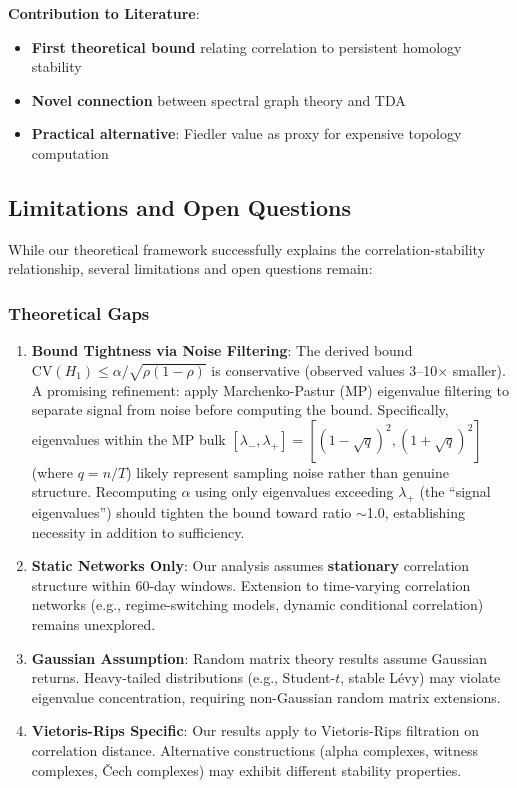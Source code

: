 \textbf{Contribution to Literature}:

\begin{itemize}
\item \textbf{First theoretical bound} relating correlation to persistent homology stability
\item \textbf{Novel connection} between spectral graph theory and TDA
\item \textbf{Practical alternative}: Fiedler value as proxy for expensive topology computation
\end{itemize}

\subsection{Limitations and Open Questions}
\label{sec:theory-limitations}

While our theoretical framework successfully explains the correlation-stability relationship, several limitations and open questions remain:

\subsubsection{Theoretical Gaps}

\begin{enumerate}
\item \textbf{Bound Tightness via Noise Filtering}: The derived bound $\text{CV}(H_1) \leq \alpha/\sqrt{\rho(1-\rho)}$ is conservative (observed values 3--10$\times$ smaller). A promising refinement: apply Marchenko-Pastur (MP) eigenvalue filtering to separate signal from noise before computing the bound. Specifically, eigenvalues within the MP bulk $[\lambda_-, \lambda_+] = [(1-\sqrt{q})^2, (1+\sqrt{q})^2]$ (where $q = n/T$) likely represent sampling noise rather than genuine structure. Recomputing $\alpha$ using only eigenvalues exceeding $\lambda_+$ (the ``signal eigenvalues'') should tighten the bound toward ratio $\sim$1.0, establishing necessity in addition to sufficiency.

\item \textbf{Static Networks Only}: Our analysis assumes \textbf{stationary} correlation structure within 60-day windows. Extension to time-varying correlation networks (e.g., regime-switching models, dynamic conditional correlation) remains unexplored.

\item \textbf{Gaussian Assumption}: Random matrix theory results assume Gaussian returns. Heavy-tailed distributions (e.g., Student-$t$, stable Lévy) may violate eigenvalue concentration, requiring non-Gaussian random matrix extensions.

\item \textbf{Vietoris-Rips Specific}: Our results apply to Vietoris-Rips filtration on correlation distance. Alternative constructions (alpha complexes, witness complexes, Čech complexes) may exhibit different stability properties.
\end{enumerate}

